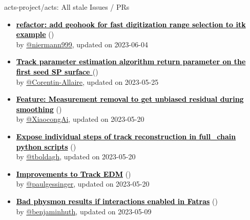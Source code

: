 \begin{frame}[allowframebreaks]{ acts-project/acts: All stale Issues / PRs}
\begin{itemize}
    \item\propen\prwip\prstale\textbf{\href{https://github.com/acts-project/acts/pull/2089}{\textcolor{black}{refactor: add geohook for fast digitization range selection to itk example}}}
    (\href{https://github.com/acts-project/acts/pull/2089}{}) \\
    by \href{https://github.com/niermann999}{@niermann999}, updated on 2023-06-04

    \item\iss\prstale\textbf{\href{https://github.com/acts-project/acts/issues/2037}{\textcolor{black}{Track parameter estimation algorithm return parameter on the first seed SP surface }}}
    (\href{https://github.com/acts-project/acts/issues/2037}{}) \\
    by \href{https://github.com/Corentin-Allaire}{@Corentin-Allaire}, updated on 2023-05-25

    \item\iss\prstale\textbf{\href{https://github.com/acts-project/acts/issues/2031}{\textcolor{black}{Feature: Measurement removal to get unbiased residual  during smoothing}}}
    (\href{https://github.com/acts-project/acts/issues/2031}{}) \\
    by \href{https://github.com/XiaocongAi}{@XiaocongAi}, updated on 2023-05-20

    \item\iss\prstale\textbf{\href{https://github.com/acts-project/acts/issues/1997}{\textcolor{black}{Expose individual steps of track reconstruction in full\_chain python scripts}}}
    (\href{https://github.com/acts-project/acts/issues/1997}{}) \\
    by \href{https://github.com/tboldagh}{@tboldagh}, updated on 2023-05-20

    \item\iss\prstale\textbf{\href{https://github.com/acts-project/acts/issues/1993}{\textcolor{black}{Improvements to Track EDM}}}
    (\href{https://github.com/acts-project/acts/issues/1993}{}) \\
    by \href{https://github.com/paulgessinger}{@paulgessinger}, updated on 2023-05-20

    \item\iss\prstale\textbf{\href{https://github.com/acts-project/acts/issues/1643}{\textcolor{black}{Bad physmon results if interactions enabled in Fatras}}}
    (\href{https://github.com/acts-project/acts/issues/1643}{}) \\
    by \href{https://github.com/benjaminhuth}{@benjaminhuth}, updated on 2023-05-09


\end{itemize}
\end{frame}
